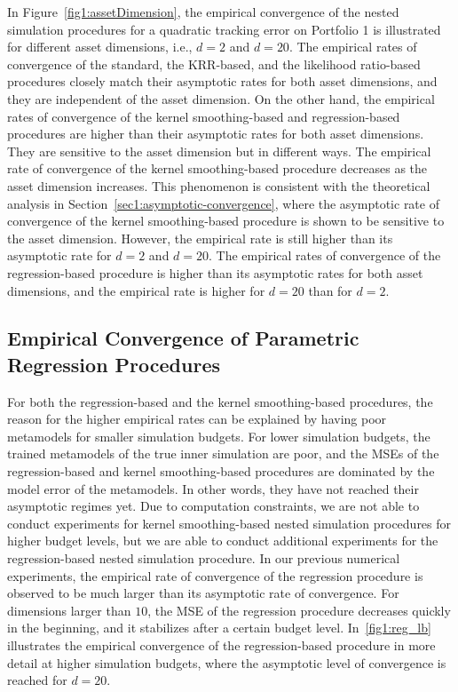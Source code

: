 In Figure~\ref{fig1:assetDimension}, the empirical convergence of the nested simulation procedures for a quadratic tracking error on Portfolio 1 is illustrated for different asset dimensions, i.e., $d = 2$ and $d = 20$.
The empirical rates of convergence of the standard, the KRR-based, and the likelihood ratio-based procedures closely match their asymptotic rates for both asset dimensions, and they are independent of the asset dimension.
On the other hand, the empirical rates of convergence of the kernel smoothing-based and regression-based procedures are higher than their asymptotic rates for both asset dimensions.
They are sensitive to the asset dimension but in different ways.
The empirical rate of convergence of the kernel smoothing-based procedure decreases as the asset dimension increases.
This phenomenon is consistent with the theoretical analysis in Section~\ref{sec1:asymptotic-convergence}, where the asymptotic rate of convergence of the kernel smoothing-based procedure is shown to be sensitive to the asset dimension.
However, the empirical rate is still higher than its asymptotic rate for $d = 2$ and $d = 20$.
The empirical rates of convergence of the regression-based procedure is higher than its asymptotic rates for both asset dimensions, and the empirical rate is higher for $d = 20$ than for $d = 2$.

\subsection{Empirical Convergence of Parametric Regression Procedures} \label{sec1:regression-convergence}

For both the regression-based and the kernel smoothing-based procedures, the reason for the higher empirical rates can be explained by having poor metamodels for smaller simulation budgets.
For lower simulation budgets, the trained metamodels of the true inner simulation are poor, and the MSEs of the regression-based and kernel smoothing-based procedures are dominated by the model error of the metamodels.
In other words, they have not reached their asymptotic regimes yet.
Due to computation constraints, we are not able to conduct experiments for kernel smoothing-based nested simulation procedures for higher budget levels, but we are able to conduct additional experiments for the regression-based nested simulation procedure.
In our previous numerical experiments, the empirical rate of convergence of the regression procedure is observed to be much larger than its asymptotic rate of convergence.
For dimensions larger than $10$, the MSE of the regression procedure decreases quickly in the beginning, and it stabilizes after a certain budget level.
In~\ref{fig1:reg_lb} illustrates the empirical convergence of the regression-based procedure in more detail at higher simulation budgets, where the asymptotic level of convergence is reached for $d = 20$.

